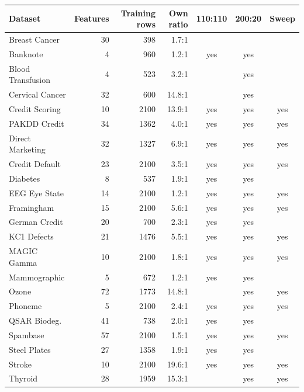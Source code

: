 \begin{tabular}{@{}lrrrccc@{}}
  \toprule
  Dataset & Features & Training rows & Own ratio & 110:110 & 200:20 & Sweep \\
  \midrule
  Breast Cancer & 30 & 398 & 1.7:1 &  &  &  \\
  Banknote & 4 & 960 & 1.2:1 & yes & yes &  \\
  Blood Transfusion & 4 & 523 & 3.2:1 &  & yes &  \\
  Cervical Cancer & 32 & 600 & 14.8:1 &  & yes &  \\
  Credit Scoring & 10 & 2100 & 13.9:1 & yes & yes & yes \\
  PAKDD Credit & 34 & 1362 & 4.0:1 & yes & yes & yes \\
  Direct Marketing & 32 & 1327 & 6.9:1 & yes & yes & yes \\
  Credit Default & 23 & 2100 & 3.5:1 & yes & yes & yes \\
  Diabetes & 8 & 537 & 1.9:1 & yes & yes &  \\
  EEG Eye State & 14 & 2100 & 1.2:1 & yes & yes & yes \\
  Framingham & 15 & 2100 & 5.6:1 & yes & yes & yes \\
  German Credit & 20 & 700 & 2.3:1 & yes & yes &  \\
  KC1 Defects & 21 & 1476 & 5.5:1 & yes & yes & yes \\
  MAGIC Gamma & 10 & 2100 & 1.8:1 & yes & yes & yes \\
  Mammographic & 5 & 672 & 1.2:1 & yes & yes &  \\
  Ozone & 72 & 1773 & 14.8:1 &  & yes & yes \\
  Phoneme & 5 & 2100 & 2.4:1 & yes & yes & yes \\
  QSAR Biodeg. & 41 & 738 & 2.0:1 & yes & yes &  \\
  Spambase & 57 & 2100 & 1.5:1 & yes & yes & yes \\
  Steel Plates & 27 & 1358 & 1.9:1 & yes & yes &  \\
  Stroke & 10 & 2100 & 19.6:1 & yes & yes & yes \\
  Thyroid & 28 & 1959 & 15.3:1 &  & yes & yes \\
  \bottomrule
\end{tabular}
